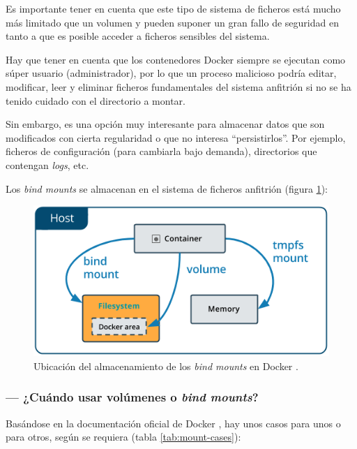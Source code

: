 Es importante tener en cuenta que este tipo de sistema de ficheros está mucho más
limitado que un volumen y pueden suponer un gran fallo de seguridad en tanto a que
es posible acceder a ficheros sensibles del sistema.

Hay que tener en cuenta que los contenedores Docker siempre se ejecutan como
súper usuario (administrador), por lo que un proceso malicioso podría editar,
modificar, leer y eliminar ficheros fundamentales del sistema anfitrión si no
se ha tenido cuidado con el directorio a montar.

Sin embargo, es una opción muy interesante para almacenar datos que son modificados
con cierta regularidad o que no interesa ``persistirlos''. Por ejemplo, ficheros
de configuración (para cambiarla bajo demanda), directorios que contengan \textit{logs},
etc.

Los \textit{bind mounts} se almacenan en el sistema de ficheros anfitrión (figura \ref{fig:bind-location}):

\begin{figure}[H]
    \centering
    \includegraphics[width=.7\linewidth]{pictures/types-of-mounts-bind.png}
    \caption{Ubicación del almacenamiento de los \textit{bind mounts} en Docker \cite{UseBindMounts2021}.}
    \label{fig:bind-location}
\end{figure}

\subsubsection*{\indent --- ¿Cuándo usar volúmenes o \textit{bind mounts}?}
Basándose en la documentación oficial de Docker \cite{ManageDataDocker2021}, hay
unos casos para unos o para otros, según se requiera (tabla \ref{tab:mount-cases}):

\newpage

